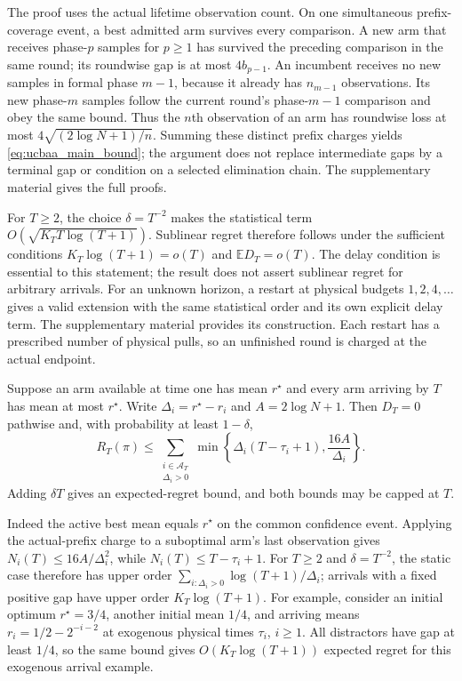 \documentclass[11pt]{article}
\begin{document}
The proof uses the actual lifetime observation count. On one simultaneous
prefix-coverage event, a best admitted arm survives every comparison.
A new arm that receives phase-$p$ samples for $p\ge1$ has survived the
preceding comparison in the same round; its roundwise gap is at most
$4b_{p-1}$. An incumbent receives no new samples in formal phase $m-1$,
because it already has $n_{m-1}$ observations. Its new phase-$m$ samples
follow the current round's phase-$m-1$ comparison and obey the same bound.
Thus the $n$th observation of an arm has roundwise loss at most
$4\sqrt{(2\log N+1)/n}$. Summing these distinct prefix charges yields
\eqref{eq:ucbaa_main_bound}; the argument does not replace intermediate gaps by a terminal gap
or condition on a selected elimination chain. The supplementary material
gives the full proofs.

For $T\ge2$, the choice $\delta=T^{-2}$ makes the statistical term
$O(\sqrt{K_TT\log(T+1)})$. Sublinear regret therefore follows under
the sufficient conditions $K_T\log(T+1)=o(T)$ and
$\mathbb E D_T=o(T)$. The delay condition is essential to this statement;
the result does not assert sublinear regret for arbitrary arrivals.
For an unknown horizon, a restart at physical budgets $1,2,4,\ldots$
gives a valid extension with the same statistical order and its own explicit
delay term. The supplementary material provides its construction.
Each restart has a prescribed number of physical pulls, so an
unfinished round is charged at the actual endpoint.

\begin{corollary}
\label{cor:ucbaa_main_fixed_gap}
Suppose an arm available at time one has mean $r^\star$ and every arm
arriving by $T$ has mean at most $r^\star$. Write
$\Delta_i=r^\star-r_i$ and $A=2\log N+1$. Then $D_T=0$ pathwise and,
with probability at least $1-\delta$,
\begin{equation}
 R_T(\pi)\le\sum_{\substack{i\in\mathcal A_T\\\Delta_i>0}}
       \min\left\{\Delta_i(T-\tau_i+1),\frac{16A}{\Delta_i}\right\}.
 \label{eq:ucbaa_main_fixed_gap}
\end{equation}
Adding $\delta T$ gives an expected-regret bound, and both bounds may
be capped at $T$.
\end{corollary}

Indeed the active best mean equals $r^\star$ on the common confidence
event. Applying the actual-prefix charge to a suboptimal arm's last
observation gives $N_i(T)\le16A/\Delta_i^2$, while
$N_i(T)\le T-\tau_i+1$. For $T\ge2$ and $\delta=T^{-2}$, the static case therefore
has upper order $\sum_{i:\Delta_i>0}\log(T+1)/\Delta_i$; arrivals with
a fixed positive gap have upper order $K_T\log(T+1)$.
For example, consider an initial optimum
$r^\star=3/4$, another initial mean $1/4$, and arriving means
$r_i=1/2-2^{-i-2}$ at exogenous physical times $\tau_i$, $i\ge1$.
All distractors have gap at least $1/4$, so the same bound gives
$O(K_T\log(T+1))$ expected regret for this exogenous arrival example.
\end{document}
